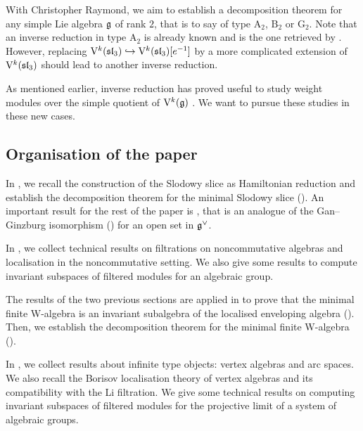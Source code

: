 With Christopher Raymond, we aim to establish a decomposition theorem for any simple Lie algebra $\mathfrak g$ of rank $2$, that is to say of type $\mathrm{A}_2$, $\mathrm{B}_2$ or $\mathrm{G}_2$. Note that an inverse reduction in type $\mathrm{A}_2$ is already known and is the one retrieved by . However, replacing $\mathrm V^k(\mathfrak{sl}_3) \hookrightarrow \mathrm V^k(\mathfrak{sl}_3)[e^{-1}]$ by a more complicated extension of $\mathrm V^k(\mathfrak{sl}_3)$ should lead to another inverse reduction. 

As mentioned earlier, inverse reduction has proved useful to study weight modules over the simple quotient of $\mathrm V^k(\mathfrak g)$ \cite{adamovic2019realizations,adamovic2021realisation,adamovic2024relaxed,fasquel2025modularity}. We want to pursue these studies in these new cases. 

\subsection{Organisation of the paper}

In , we recall the construction of the Slodowy slice as Hamiltonian reduction and establish the decomposition theorem for the minimal Slodowy slice (). An important result for the rest of the paper is , that is an analogue of the Gan--Ginzburg isomorphism () for an open set in $\mathfrak g^\vee$. 

In , we collect technical results on filtrations on noncommutative algebras and localisation in the noncommutative setting. We also give some results to compute invariant subspaces of filtered modules for an algebraic group.

The results of the two previous sections are applied in  to prove that the minimal finite W-algebra is an invariant subalgebra of the localised enveloping algebra (). Then, we establish the decomposition theorem for the minimal finite W-algebra ().

In , we collect results about infinite type objects: vertex algebras and arc spaces. We also recall the Borisov localisation theory of vertex algebras and its compatibility with the Li filtration. We give some technical results on computing invariant subspaces of filtered modules for the projective limit of a system of algebraic groups. 

